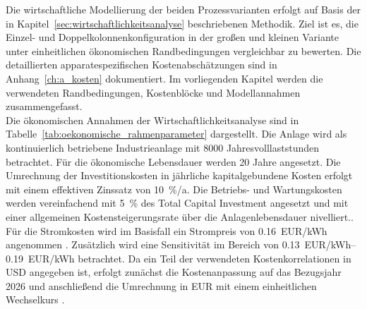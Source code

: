 Die wirtschaftliche Modellierung der beiden Prozessvarianten erfolgt auf Basis der in Kapitel~\ref{sec:wirtschaftlichkeitsanalyse} beschriebenen Methodik. Ziel ist es, die Einzel- und Doppelkolonnenkonfiguration in der großen und kleinen Variante unter einheitlichen ökonomischen Randbedingungen vergleichbar zu bewerten. Die detaillierten apparatespezifischen Kostenabschätzungen sind in Anhang~\ref{ch:a_kosten} dokumentiert. Im vorliegenden Kapitel werden die verwendeten Randbedingungen, Kostenblöcke und Modellannahmen zusammengefasst.\\
Die ökonomischen Annahmen der Wirtschaftlichkeitsanalyse sind in Tabelle~\ref{tab:oekonomische_rahmenparameter} dargestellt. Die Anlage wird als kontinuierlich betriebene Industrieanlage mit 8000 Jahresvolllaststunden betrachtet. Für die ökonomische Lebensdauer werden 20 Jahre angesetzt. Die Umrechnung der Investitionskosten in jährliche kapitalgebundene Kosten erfolgt mit einem effektiven Zinssatz von \SI{10}{\percent/a}. Die Betriebs- und Wartungskosten werden vereinfachend mit \SI{5}{\percent}
des Total Capital Investment angesetzt und mit einer allgemeinen Kostensteigerungsrate über die Anlagenlebensdauer nivelliert.. Für die Stromkosten wird im Basisfall ein Strompreis von \SI{0,16}{EUR/kWh} angenommen \cite{SMARDEntwicklungIndustriestrompreise, bdewBDEWStrompreisanalyseApril2026}. Zusätzlich wird eine Sensitivität im Bereich von \SIrange{0,13}{0,19}{EUR/kWh} betrachtet. Da ein Teil der verwendeten Kostenkorrelationen in USD angegeben ist, erfolgt zunächst die Kostenanpassung auf das Bezugsjahr 2026 und anschließend die Umrechnung in EUR mit einem einheitlichen Wechselkurs \cite{bank_euro_2026}.

